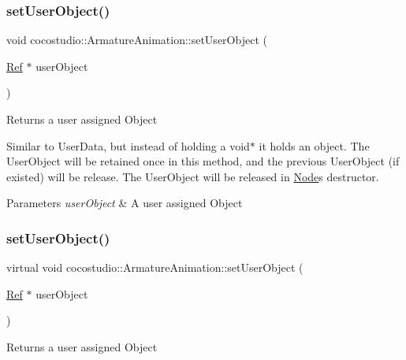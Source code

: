 \subsubsection{\texorpdfstring{set\+User\+Object()}{setUserObject()}\hspace{0.1cm}{\footnotesize\ttfamily [1/2]}}
{\footnotesize\ttfamily void cocostudio\+::\+Armature\+Animation\+::set\+User\+Object (\begin{DoxyParamCaption}\item[{\hyperlink{classRef}{Ref} $\ast$}]{user\+Object }\end{DoxyParamCaption})\hspace{0.3cm}{\ttfamily [virtual]}}

Returns a user assigned Object

Similar to User\+Data, but instead of holding a void$\ast$ it holds an object. The User\+Object will be retained once in this method, and the previous User\+Object (if existed) will be release. The User\+Object will be released in \hyperlink{classNode}{Node}\textquotesingle{}s destructor.


\begin{DoxyParams}{Parameters}
{\em user\+Object} & A user assigned Object \\
\hline
\end{DoxyParams}
\mbox{\label{classcocostudio_1_1ArmatureAnimation_a418ce11bc98bab3a4c008aa2a0147536}} 
\subsubsection{\texorpdfstring{set\+User\+Object()}{setUserObject()}\hspace{0.1cm}{\footnotesize\ttfamily [2/2]}}
{\footnotesize\ttfamily virtual void cocostudio\+::\+Armature\+Animation\+::set\+User\+Object (\begin{DoxyParamCaption}\item[{\hyperlink{classRef}{Ref} $\ast$}]{user\+Object }\end{DoxyParamCaption})\hspace{0.3cm}{\ttfamily [virtual]}}

Returns a user assigned Object

